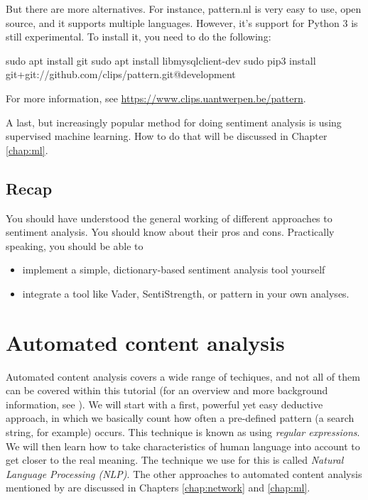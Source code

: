 \documentclass[a4paper,12pt]{book}
\begin{document}
But there are more alternatives. For instance, pattern.nl \citep{DeSmedt2012} is very easy to use, open source, and it supports multiple languages. However, it's support for Python 3 is still experimental. 
To install it, you need to do the following:
\begin{lstlistingbash}
sudo apt install git
sudo apt install libmysqlclient-dev
sudo pip3 install git+git://github.com/clips/pattern.git@development
\end{lstlistingbash}

For more information, see \url{https://www.clips.uantwerpen.be/pattern}.

A last, but increasingly popular method for doing sentiment analysis is using supervised machine learning. How to do that will be discussed in Chapter \ref{chap:ml}.


\section{Recap}
You should have understood the general working of different approaches to sentiment analysis. You should know about their pros and cons. Practically speaking, you should be able to
\begin{itemize}
	\item implement a simple, dictionary-based sentiment analysis tool yourself
	\item integrate a tool like Vader, SentiStrength, or pattern in your own analyses.
\end{itemize}

\chapter{Automated content analysis}
Automated content analysis covers a wide range of techiques, and not all of them can be covered within this tutorial (for an overview and more background information, see \cite{Boumans2016}). We will start with a first, powerful yet easy deductive approach, in which we basically count how often a pre-defined pattern (a search string, for example) occurs. This technique is known as using \emph{regular expressions}. We will then learn how to take characteristics of human language into account to get closer to the real meaning. The technique we use for this is called \emph{Natural Language Processing (NLP)}.
The other approaches to automated content analysis mentioned by \cite{Boumans2016} are discussed in Chapters \ref{chap:network} and \ref{chap:ml}.
\end{document}
